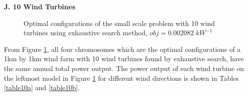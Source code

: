     \textbf{J. 10 Wind Turbines}
        \begin{figure}[H]
            \centering
            \qquad
            \qquad
            \qquad
            \caption{Optimal configurations of the small scale problem with 10 wind turbines using exhaustive search method, $obj=0.002082\;kW^{-1}$}
            \label{small10}
        \end{figure}
        
        From Figure \ref{small10}, all four chromosomes which are the optimal configurations of a 1km by 1km wind farm with 10 wind turbines found by exhaustive search, have the same annual total power output. The power output of each wind turbine on the leftmost model in Figure \ref{small10} for different wind directions is shown in Tables \ref{table10a} and \ref{table10b}.
        

